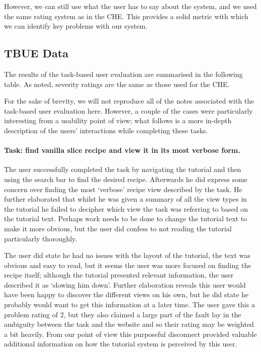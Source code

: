 However, we can still use what the user has to say about the system,
and we used the same rating system as in the CHE. This provides a
solid metric with which we can identify key problems with our system.

\subsection{TBUE Data}

The results of the task-based user evaluation are summarised in the
following table. As noted, severity ratings are the same as those used
for the CHE.



For the sake of brevity, we will not reproduce all of the notes
associated with the task-based user evaluation here. However, a couple
of the cases were particularly interesting from a usability point of
view; what follows is a more in-depth description of the users'
interactions while completing these tasks.

\paragraph{Task: find vanilla slice recipe and view it in its most verbose form.}

The user successfully completed the task by navigating the tutorial
and then using the search bar to find the desired recipe. Afterwards
he did express some concern over finding the most `verbose' recipe
view described by the task. He further elaborated that whilst he was
given a summary of all the view types in the tutorial he failed to
decipher which view the task was referring to based on the tutorial
text. Perhaps work needs to be done to change the tutorial text to
make it more obvious, but the user did confess to not reading the
tutorial particularly thoroughly.

The user did state he had no issues with the layout of the tutorial,
the text was obvious and easy to read, but it seems the user was more
focused on finding the recipe itself; although the tutorial presented
relevant information, the user described it as `slowing him
down'. Further elaboration reveals this user would have been happy to
discover the different views on his own, but he did state he probably
would want to get this information at a later time. The user gave this
a problem rating of 2, but they also claimed a large part of the fault
lay in the ambiguity between the task and the website and so their
rating may be weighted a bit heavily. From our point of view this
purposeful disconnect provided valuable additional information on how
the tutorial system is perceived by this user.

